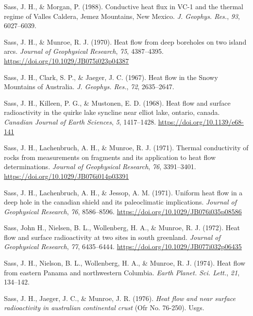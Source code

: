 \documentclass[draft,linenumbers]{agujournal2018}
\begin{document}
\leavevmode{}%
Sass, J. H., \& Morgan, P. (1988). Conductive heat flux in VC-1 and the
thermal regime of {Valles Caldera, Jemez Mountains, New Mexico}.
\emph{J. Geophys. Res.}, \emph{93}, 6027--6039.

\leavevmode{}%
Sass, J. H., \& Munroe, R. J. (1970). Heat flow from deep boreholes on
two island arcs. \emph{Journal of Geophysical Research}, \emph{75},
4387--4395. \url{https://doi.org/10.1029/JB075i023p04387}

\leavevmode{}%
Sass, J. H., Clark, S. P., \& Jaeger, J. C. (1967). Heat flow in the
{Snowy Mountains of Australia}. \emph{J. Geophys. Res.}, \emph{72},
2635--2647.

\leavevmode{}%
Sass, J. H., Killeen, P. G., \& Mustonen, E. D. (1968). Heat flow and
surface radioactivity in the quirke lake syncline near elliot lake,
ontario, canada. \emph{Canadian Journal of Earth Sciences}, \emph{5},
1417--1428. \url{https://doi.org/10.1139/e68-141}

\leavevmode{}%
Sass, J. H., Lachenbruch, A. H., \& Munroe, R. J. (1971). Thermal
conductivity of rocks from measurements on fragments and its application
to heat flow determinations. \emph{Journal of Geophysical Research},
\emph{76}, 3391--3401. \url{https://doi.org/10.1029/JB076i014p03391}

\leavevmode{}%
Sass, J. H., Lachenbruch, A. H., \& Jessop, A. M. (1971). Uniform heat
flow in a deep hole in the canadian shield and its paleoclimatic
implications. \emph{Journal of Geophysical Research}, \emph{76},
8586--8596. \url{https://doi.org/10.1029/JB076i035p08586}

\leavevmode{}%
Sass, John H., Nielsen, B. L., Wollenberg, H. A., \& Munroe, R. J.
(1972). Heat flow and surface radioactivity at two sites in south
greenland. \emph{Journal of Geophysical Research}, \emph{77},
6435--6444. \url{https://doi.org/10.1029/JB077i032p06435}

\leavevmode{}%
Sass, J. H., Nielson, B. L., Wollenberg, H. A., \& Munroe, R. J. (1974).
Heat flow from eastern {Panama} and northwestern {Columbia}. \emph{Earth
Planet. Sci. Lett.}, \emph{21}, 134--142.

\leavevmode{}%
Sass, J. H., Jaeger, J. C., \& Munroe, J. R. (1976). \emph{Heat flow and
near surface radioactivity in australian continental crust} (Ofr No.
76-250). Usgs.
\end{document}
